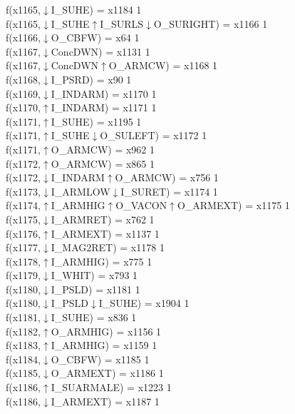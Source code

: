 f(x1165,$\downarrow$I\_SUHE) = x1184 {1} \\
f(x1165,$\downarrow$I\_SUHE$\uparrow$I\_SURLS$\downarrow$O\_SURIGHT) = x1166 {1} \\
f(x1166,$\downarrow$O\_CBFW) = x64 {1} \\
f(x1167,$\downarrow$ConcDWN) = x1131 {1} \\
f(x1167,$\downarrow$ConcDWN$\uparrow$O\_ARMCW) = x1168 {1} \\
f(x1168,$\downarrow$I\_PSRD) = x90 {1} \\
f(x1169,$\downarrow$I\_INDARM) = x1170 {1} \\
f(x1170,$\uparrow$I\_INDARM) = x1171 {1} \\
f(x1171,$\uparrow$I\_SUHE) = x1195 {1} \\
f(x1171,$\uparrow$I\_SUHE$\downarrow$O\_SULEFT) = x1172 {1} \\
f(x1171,$\uparrow$O\_ARMCW) = x962 {1} \\
f(x1172,$\uparrow$O\_ARMCW) = x865 {1} \\
f(x1172,$\downarrow$I\_INDARM$\uparrow$O\_ARMCW) = x756 {1} \\
f(x1173,$\downarrow$I\_ARMLOW$\downarrow$I\_SURET) = x1174 {1} \\
f(x1174,$\uparrow$I\_ARMHIG$\uparrow$O\_VACON$\uparrow$O\_ARMEXT) = x1175 {1} \\
f(x1175,$\downarrow$I\_ARMRET) = x762 {1} \\
f(x1176,$\uparrow$I\_ARMEXT) = x1137 {1} \\
f(x1177,$\downarrow$I\_MAG2RET) = x1178 {1} \\
f(x1178,$\uparrow$I\_ARMHIG) = x775 {1} \\
f(x1179,$\downarrow$I\_WHIT) = x793 {1} \\
f(x1180,$\downarrow$I\_PSLD) = x1181 {1} \\
f(x1180,$\downarrow$I\_PSLD$\downarrow$I\_SUHE) = x1904 {1} \\
f(x1181,$\downarrow$I\_SUHE) = x836 {1} \\
f(x1182,$\uparrow$O\_ARMHIG) = x1156 {1} \\
f(x1183,$\uparrow$I\_ARMHIG) = x1159 {1} \\
f(x1184,$\downarrow$O\_CBFW) = x1185 {1} \\
f(x1185,$\downarrow$O\_ARMEXT) = x1186 {1} \\
f(x1186,$\uparrow$I\_SUARMALE) = x1223 {1} \\
f(x1186,$\downarrow$I\_ARMEXT) = x1187 {1} \\
